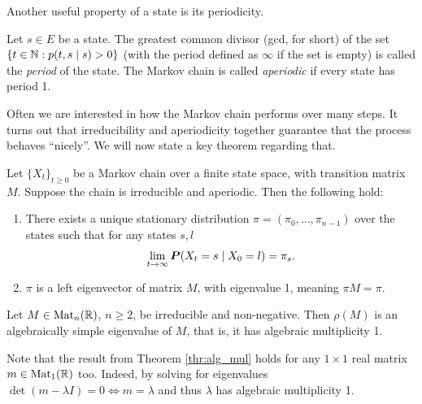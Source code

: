 Another useful property of a state is its periodicity.
\begin{df}
    Let $s\in E$ be a state. The greatest common divisor (gcd, for short) of the set $\{t\in\mathbb{N}: p(t,s\mid s) > 0\}$ (with the period defined as $\infty$ if the set is empty) is called the \textit{period} of the state. The Markov chain is called \textit{aperiodic} if every state has period 1.
\end{df}

Often we are interested in how the Markov chain performs over many steps. It turns out that irreducibility and aperiodicity together guarantee that the process behaves \enquote{nicely}. We will now state a key theorem regarding that.

\begin{theorem}\label{ergodic}
    Let $\{X_t\}_{t\geq 0}$ be a Markov chain over a finite state space, with transition matrix $M$. Suppose the chain is irreducible and aperiodic. Then the following hold:
    \begin{enumerate}
        \renewcommand{\labelenumi}{\arabic{enumi}.}
        \item There exists a unique stationary distribution $\pi=(\pi_0,\dots, \pi_{n-1})$ over the states such that for any states $s,l$
            \begin{equation*}
                \lim\limits_{t\to\infty}\boldsymbol{P}(X_t=s\mid X_0=l)=\pi_s.
            \end{equation*}
        \item $\pi$ is a left eigenvector of matrix $M$, with eigenvalue 1, meaning $\pi M = \pi$.
    \end{enumerate}
\end{theorem}

\begin{theorem}\label{thr:alg_mul}
    Let $M\in\text{Mat}_n(\mathbb{R})$, $n\geq 2$, be irreducible and non-negative. Then $\rho(M)$ is an algebraically simple eigenvalue of $M$, that is, it has algebraic multiplicity 1.
\end{theorem}

Note that the result from Theorem \ref{thr:alg_mul} holds for any $1\times 1$ real matrix $m\in\text{Mat}_1(\mathbb{R})$ too. Indeed, by solving for eigenvalues $\det(m-\lambda I) = 0 \Leftrightarrow m = \lambda$ and thus $\lambda$ has algebraic multiplicity 1.